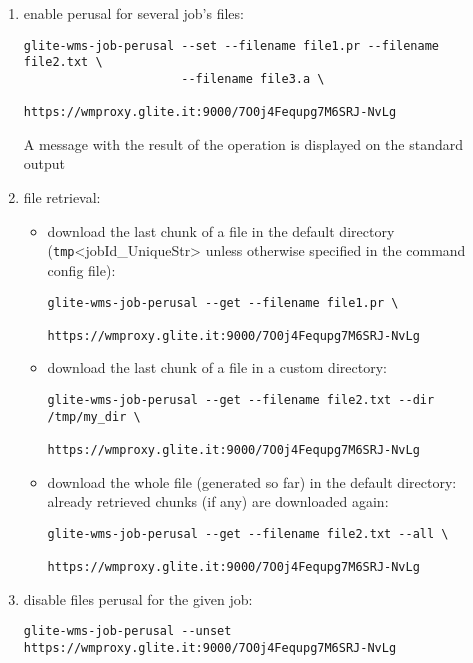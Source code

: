 \begin{enumerate}


\item  enable perusal for several job's files:
\begin{verbatim}
glite-wms-job-perusal --set --filename file1.pr --filename file2.txt \
                      --filename file3.a \
                      https://wmproxy.glite.it:9000/7O0j4Fequpg7M6SRJ-NvLg
\end{verbatim}
A message with the result of the operation is displayed on the standard output


\item  file retrieval:

\begin{itemize}


\item  download the last chunk of a file in the default directory 
(\verb /tmp/<jobId_UniqueStr> {} unless otherwise specified in the command config file):
\begin{verbatim}
glite-wms-job-perusal --get --filename file1.pr \
                      https://wmproxy.glite.it:9000/7O0j4Fequpg7M6SRJ-NvLg
\end{verbatim}

\item  download the last chunk of a file in a custom directory:
\begin{verbatim}
glite-wms-job-perusal --get --filename file2.txt --dir /tmp/my_dir \
                      https://wmproxy.glite.it:9000/7O0j4Fequpg7M6SRJ-NvLg
\end{verbatim}

\item  download the whole file (generated so far) in the default
directory: already retrieved chunks (if any) are downloaded again:
\begin{verbatim}
glite-wms-job-perusal --get --filename file2.txt --all \
                      https://wmproxy.glite.it:9000/7O0j4Fequpg7M6SRJ-NvLg
\end{verbatim}

\end{itemize}



\item  disable files perusal for the given job:
\begin{verbatim}
glite-wms-job-perusal --unset https://wmproxy.glite.it:9000/7O0j4Fequpg7M6SRJ-NvLg
\end{verbatim}

\end{enumerate}



